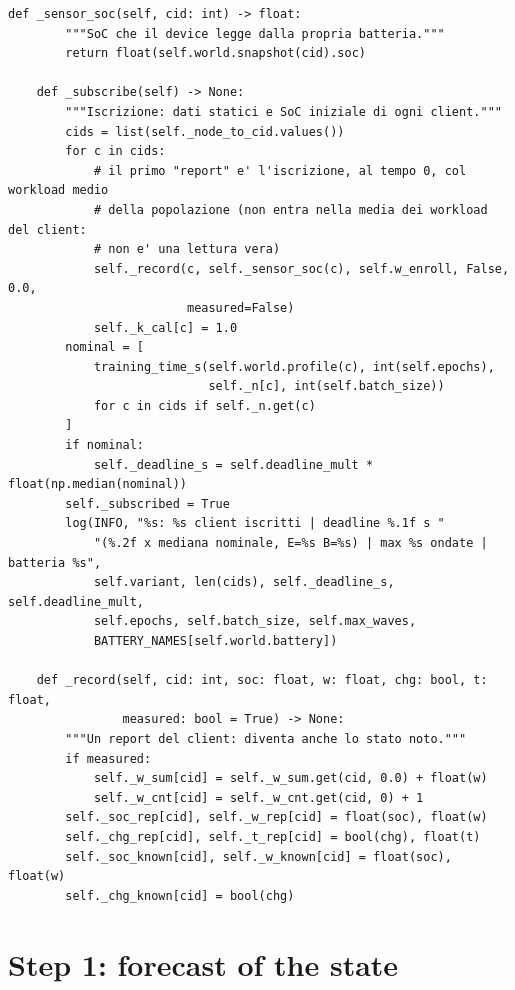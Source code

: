 \documentclass[11pt,a4paper]{article}
\begin{document}
\begin{lstlisting}[style=py,firstnumber=344,caption={\texttt{tesifl/strategies/sage\_smart.py}, lines 344--381}]
    def _sensor_soc(self, cid: int) -> float:
        """SoC che il device legge dalla propria batteria."""
        return float(self.world.snapshot(cid).soc)

    def _subscribe(self) -> None:
        """Iscrizione: dati statici e SoC iniziale di ogni client."""
        cids = list(self._node_to_cid.values())
        for c in cids:
            # il primo "report" e' l'iscrizione, al tempo 0, col workload medio
            # della popolazione (non entra nella media dei workload del client:
            # non e' una lettura vera)
            self._record(c, self._sensor_soc(c), self.w_enroll, False, 0.0,
                         measured=False)
            self._k_cal[c] = 1.0
        nominal = [
            training_time_s(self.world.profile(c), int(self.epochs),
                            self._n[c], int(self.batch_size))
            for c in cids if self._n.get(c)
        ]
        if nominal:
            self._deadline_s = self.deadline_mult * float(np.median(nominal))
        self._subscribed = True
        log(INFO, "%s: %s client iscritti | deadline %.1f s "
            "(%.2f x mediana nominale, E=%s B=%s) | max %s ondate | batteria %s",
            self.variant, len(cids), self._deadline_s, self.deadline_mult,
            self.epochs, self.batch_size, self.max_waves,
            BATTERY_NAMES[self.world.battery])

    def _record(self, cid: int, soc: float, w: float, chg: bool, t: float,
                measured: bool = True) -> None:
        """Un report del client: diventa anche lo stato noto."""
        if measured:
            self._w_sum[cid] = self._w_sum.get(cid, 0.0) + float(w)
            self._w_cnt[cid] = self._w_cnt.get(cid, 0) + 1
        self._soc_rep[cid], self._w_rep[cid] = float(soc), float(w)
        self._chg_rep[cid], self._t_rep[cid] = bool(chg), float(t)
        self._soc_known[cid], self._w_known[cid] = float(soc), float(w)
        self._chg_known[cid] = bool(chg)
\end{lstlisting}

\newpage
\section{Step 1: forecast of the state}
\label{sec:forecast}
\end{document}
